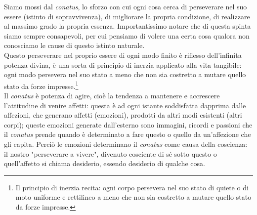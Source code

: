 Siamo mossi dal \textit{conatus}, lo sforzo con cui ogni cosa cerca di perseverare nel suo essere (istinto di sopravvivenza), di migliorare la propria condizione, di realizzare al massimo grado la propria essenza. Importantissimo notare che di questa spinta siamo sempre consapevoli, per cui pensiamo di volere una certa cosa qualora non conosciamo le cause di questo istinto naturale.\\
Questo perseverare nel proprio essere di ogni modo finito è riflesso dell'infinita potenza divina, è una sorta di principio di inerzia applicato alla vita tangibile: ogni modo persevera nel suo stato a meno che non sia costretto a mutare quello stato da forze impresse.\footnote{Il principio di inerzia recita: ogni corpo persevera nel suo stato di quiete o di moto uniforme e rettilineo a meno che non sia costretto a mutare quello stato da forze impresse.}\\
Il \textit{conatus} è potenza di agire, cioè la tendenza a mantenere e accrescere l'attitudine di venire affetti: questa è ad ogni istante soddisfatta dapprima dalle affezioni, che generano affetti (emozioni), prodotti da altri modi esistenti (altri corpi); queste emozioni generate dall'esterno sono immagini, ricordi e passioni che il \textit{conatus} prende quando è determinato a fare questo o quello da un'affezione che gli capita. Perciò le emozioni determinano il \textit{conatus} come causa della coscienza: il nostro "perseverare a vivere", divenuto cosciente di sé sotto questo o quell'affetto si chiama desiderio, essendo desiderio di qualche cosa.




